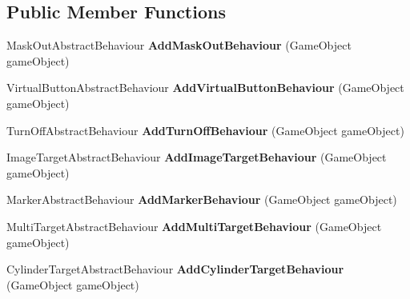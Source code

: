 \subsection*{Public Member Functions}
\begin{DoxyCompactItemize}
\item 
\hypertarget{class_vuforia_1_1_vuforia_behaviour_component_factory_a3e12dc1df322c8f8edbbc7fcff7104f9}{}Mask\+Out\+Abstract\+Behaviour {\bfseries Add\+Mask\+Out\+Behaviour} (Game\+Object game\+Object)\label{class_vuforia_1_1_vuforia_behaviour_component_factory_a3e12dc1df322c8f8edbbc7fcff7104f9}

\item 
\hypertarget{class_vuforia_1_1_vuforia_behaviour_component_factory_a563ffb87228514a542ddcd3c21e5a377}{}Virtual\+Button\+Abstract\+Behaviour {\bfseries Add\+Virtual\+Button\+Behaviour} (Game\+Object game\+Object)\label{class_vuforia_1_1_vuforia_behaviour_component_factory_a563ffb87228514a542ddcd3c21e5a377}

\item 
\hypertarget{class_vuforia_1_1_vuforia_behaviour_component_factory_a90b71952e0e28bfb17dba3149b096303}{}Turn\+Off\+Abstract\+Behaviour {\bfseries Add\+Turn\+Off\+Behaviour} (Game\+Object game\+Object)\label{class_vuforia_1_1_vuforia_behaviour_component_factory_a90b71952e0e28bfb17dba3149b096303}

\item 
\hypertarget{class_vuforia_1_1_vuforia_behaviour_component_factory_a29340a2ace9464069e9336083734c028}{}Image\+Target\+Abstract\+Behaviour {\bfseries Add\+Image\+Target\+Behaviour} (Game\+Object game\+Object)\label{class_vuforia_1_1_vuforia_behaviour_component_factory_a29340a2ace9464069e9336083734c028}

\item 
\hypertarget{class_vuforia_1_1_vuforia_behaviour_component_factory_a93185f86ebde48b16f05cc4216dd316a}{}Marker\+Abstract\+Behaviour {\bfseries Add\+Marker\+Behaviour} (Game\+Object game\+Object)\label{class_vuforia_1_1_vuforia_behaviour_component_factory_a93185f86ebde48b16f05cc4216dd316a}

\item 
\hypertarget{class_vuforia_1_1_vuforia_behaviour_component_factory_add09ad5d1b33e1e7f0c2569d1ef970a2}{}Multi\+Target\+Abstract\+Behaviour {\bfseries Add\+Multi\+Target\+Behaviour} (Game\+Object game\+Object)\label{class_vuforia_1_1_vuforia_behaviour_component_factory_add09ad5d1b33e1e7f0c2569d1ef970a2}

\item 
\hypertarget{class_vuforia_1_1_vuforia_behaviour_component_factory_ab810a422fe39cc76e0601022d145c544}{}Cylinder\+Target\+Abstract\+Behaviour {\bfseries Add\+Cylinder\+Target\+Behaviour} (Game\+Object game\+Object)\label{class_vuforia_1_1_vuforia_behaviour_component_factory_ab810a422fe39cc76e0601022d145c544}


\end{DoxyCompactItemize}
